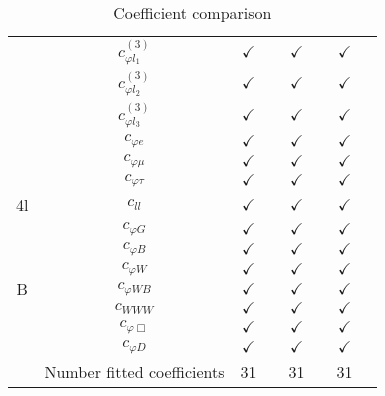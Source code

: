 \documentclass{article}
\begin{document}
\begin{table}[H]
\begin{tabular}{|c|c|c|c|c|c|c|c|}
 & $c_{\varphi l_1}^{(3)}$ & $\checkmark$ &  & $\checkmark$ &  & $\checkmark$ & \\ \cline{2-8}
 & $c_{\varphi l_2}^{(3)}$ & $\checkmark$ &  & $\checkmark$ &  & $\checkmark$ & \\ \cline{2-8}
 & $c_{\varphi l_3}^{(3)}$ & $\checkmark$ &  & $\checkmark$ &  & $\checkmark$ & \\ \cline{2-8}
 & $c_{\varphi e}$ & $\checkmark$ &  & $\checkmark$ &  & $\checkmark$ & \\ \cline{2-8}
 & $c_{\varphi \mu}$ & $\checkmark$ &  & $\checkmark$ &  & $\checkmark$ & \\ \cline{2-8}
 & $c_{\varphi \tau}$ & $\checkmark$ &  & $\checkmark$ &  & $\checkmark$ &
\\ \hline
\multirow{1}{*}{4l}
 & $c_{ll}$ & $\checkmark$ &  & $\checkmark$ &  & $\checkmark$ &
\\ \hline
\multirow{7}{*}{B}
 & $c_{\varphi G}$ & $\checkmark$ &  & $\checkmark$ &  & $\checkmark$ & \\ \cline{2-8}
 & $c_{\varphi B}$ & $\checkmark$ &  & $\checkmark$ &  & $\checkmark$ & \\ \cline{2-8}
 & $c_{\varphi W}$ & $\checkmark$ &  & $\checkmark$ &  & $\checkmark$ & \\ \cline{2-8}
 & $c_{\varphi WB}$ & $\checkmark$ &  & $\checkmark$ &  & $\checkmark$ & \\ \cline{2-8}
 & $c_{WWW}$ & $\checkmark$ &  & $\checkmark$ &  & $\checkmark$ & \\ \cline{2-8}
 & $c_{\varphi \Box}$ & $\checkmark$ &  & $\checkmark$ &  & $\checkmark$ & \\ \cline{2-8}
 & $c_{\varphi D}$ & $\checkmark$ &  & $\checkmark$ &  & $\checkmark$ &
\\ \hline
\hline & Number fitted coefficients & 31 &  & 31 &  & 31 &  \\ \hline
\end{tabular}
\caption{Coefficient comparison}
\end{table}
\end{document}
